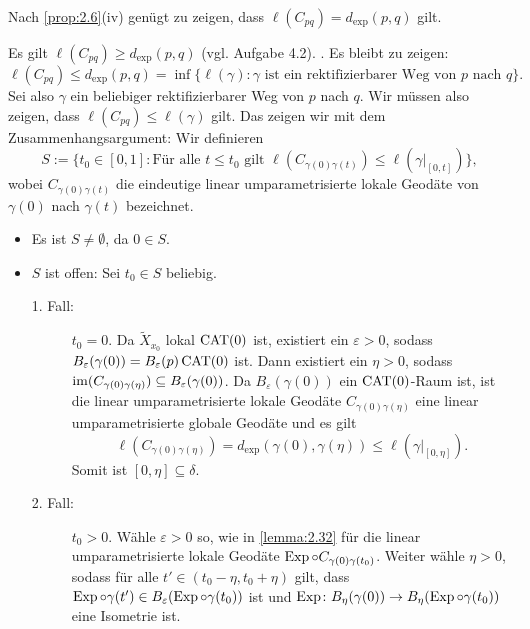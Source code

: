 \begin{beweis}
	Nach \autoref{prop:2.6}(iv) genügt zu zeigen, dass $\ell(C_{pq}) = d_{\exp}(p,q)$ gilt.
	
	Es gilt $\ell(C_{pq}) \geq d_{\exp}(p,q)$ (vgl. Aufgabe 4.2). . Es bleibt zu zeigen:
	\[
		\ell(C_{pq}) \leq d_{\exp}(p,q) = \inf\{ \ell(\gamma) : \gamma \text{ ist ein rektifizierbarer Weg von } p \text{ nach } q\}.
	\]
	Sei also $\gamma$ ein beliebiger rektifizierbarer Weg von $p$ nach $q$.
	Wir müssen also zeigen, dass $\ell(C_{pq}) \leq \ell(\gamma)$ gilt.
	Das zeigen wir mit dem Zusammenhangsargument:
	Wir definieren
	\[
		S := \{ t_0 \in [0,1] : \text{Für alle } t \leq t_0 \text{ gilt } \ell(C_{\gamma(0)\gamma(t)}) \leq \ell(\gamma \big|_{[0,t]})\},
	\]
	wobei $C_{\gamma(0)\gamma(t)}$ die eindeutige linear umparametrisierte lokale Geodäte von $\gamma(0)$ nach $\gamma(t)$ bezeichnet.
	\begin{itemize}
		\item Es ist $S \neq \emptyset$, da $0 \in S$.
		\item $S$ ist offen:
		Sei $t_0 \in S$ beliebig.
		\begin{description}
			\item [1. Fall:] $t_0 = 0$.
			Da $\tilde{X}_{x_0}$ lokal $\operatorname{CAT(0)}$ ist, existiert ein $\varepsilon > 0$, sodass $B_\varepsilon(\gamma(0)) = B_\varepsilon(p) \operatorname{CAT(0)}$ ist.
			Dann existiert ein $\eta > 0$, sodass $\operatorname{im}(C_{\gamma(0)\gamma(\eta)}) \subseteq B_\varepsilon(\gamma(0))$.
			Da $B_\varepsilon(\gamma(0))$ ein $\operatorname{CAT(0)}$-Raum ist, ist die linear umparametrisierte lokale Geodäte $C_{\gamma(0)\gamma(\eta)}$ eine linear umparametrisierte globale Geodäte und es gilt
			\[
				\ell(C_{\gamma(0)\gamma(\eta)}) = d_{\exp}(\gamma(0),\gamma(\eta)) \leq \ell(\gamma \big|_{[0,\eta]}).
			\]
			Somit ist $[0,\eta] \subseteq \delta$.
			\item[2. Fall:] $t_0 > 0$.
			Wähle $\varepsilon > 0$ so, wie in \autoref{lemma:2.32} für die linear umparametrisierte lokale Geodäte $\operatorname{Exp} \circ C_{\gamma(0)\gamma(t_0)}$.
			Weiter wähle $\eta > 0$, sodass für alle $t' \in (t_0-\eta, t_0 + \eta)$ gilt, dass $\operatorname{Exp} \circ \gamma(t') \in B_\varepsilon(\operatorname{Exp} \circ \gamma(t_0))$ ist und $\operatorname{Exp} \colon B_\eta(\gamma(0)) \rightarrow B_\eta(\operatorname{Exp}\circ \gamma(t_0))$ eine Isometrie ist.
			

\end{description}
\end{itemize}
\end{beweis}
